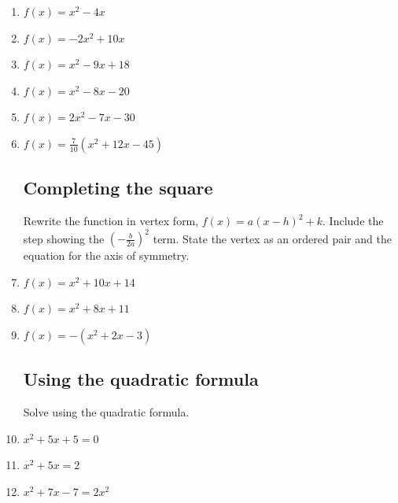 \documentclass[]{book}
\begin{document}
\begin{enumerate}

\item   $f(x)=x^2-4x$
\item   $f(x)=-2x^2+10x$
\item   $f(x)=x^2-9x+18$
\item   $f(x)=x^2-8x-20$
\item   $f(x)=2x^2-7x-30$
\item   $f(x)=\frac{7}{10}(x^2+12x-45)$

\subsection*{Completing the square}

Rewrite the function in vertex form, $f(x)=a(x-h)^2+k$. Include the step showing the $(-\frac{b}{2a})^2$ term. State the vertex as an ordered pair and the equation for the axis of symmetry.
\item   $f(x)=x^2+10x+14$
\item   $f(x)=x^2+8x+11$
\item   $f(x)=-(x^2+2x-3)$

\subsection*{Using the quadratic formula}

Solve using the quadratic formula.
\item   $x^2+5x+5=0$
\item   $x^2+5x = 2$
\item   $x^2+7x -7 = 2x^2$

\newpage

\end{enumerate}
\end{document}
